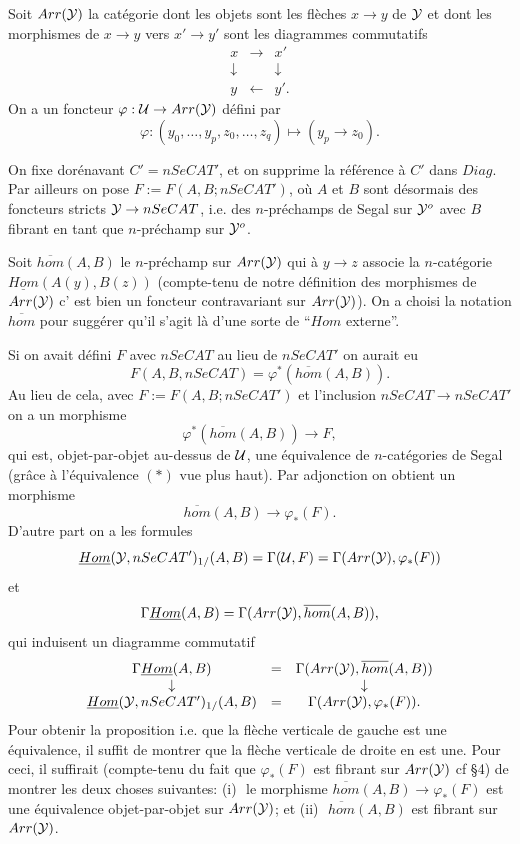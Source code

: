 \documentclass[12pt]{article}
\newcommand{\Uu}{{\cal U}}
\newcommand{\Yy}{{\cal Y}}
\begin{document}
Soit $Arr(\Yy )$ la cat\'egorie dont les objets sont les fl\`eches
$x\rightarrow y$ de $\Yy$ et dont les morphismes de
$x\rightarrow y$ vers $x'\rightarrow y'$ sont les diagrammes commutatifs
$$
\begin{array}{ccc}
x & \rightarrow & x' \\
\downarrow && \downarrow \\
y& \leftarrow & y' .
\end{array}
$$
On a un foncteur $\varphi : \Uu \rightarrow Arr (\Yy )$ d\'efini par
$$
\varphi : (y_0,\ldots , y_p,z_0,\ldots , z_q)\mapsto (y_p\rightarrow z_0).
$$

On fixe dor\'enavant $C'=nSeCAT'$, et on supprime la r\'ef\'erence \`a
$C'$ dans
$Diag$. Par ailleurs on pose $F:=F(A,B; nSeCAT')$,
o\`u $A$ et $B$ sont d\'esormais
des foncteurs stricts $\Yy \rightarrow nSeCAT$,
i.e. des $n$-pr\'echamps de Segal sur $\Yy ^o$ avec
$B$
fibrant en tant que $n$-pr\'echamp sur $\Yy^o$.

Soit $\overline{hom}(A,B)$ le $n$-pr\'echamp sur $Arr (\Yy )$ qui \`a
$y\rightarrow z$ associe la $n$-cat\'egorie \linebreak
$\underline{Hom}(A(y),B(z))$ (compte-tenu de notre d\'efinition des
morphismes de $Arr(\Yy )$ c'
est bien un foncteur contravariant sur $Arr(\Yy )$). On a choisi
la notation $\overline{hom}$ pour sugg\'erer
qu'il s'agit l\`a d'une sorte de  ``$Hom$ externe''.

Si on avait d\'efini $F$ avec $nSeCAT$ au lieu de $nSeCAT'$
on aurait eu
$$
F(A,B, nSeCAT) = \varphi ^{\ast} (\overline{hom}(A,B)).
$$
Au lieu de cela, avec
$F:= F(A,B; nSeCAT')$
et l'inclusion
$nSeCAT\rightarrow nSeCAT'$ on a un morphisme
$$
\varphi ^{\ast} (\overline{hom}(A,B))\rightarrow F,
$$
qui est, objet-par-objet au-dessus de $\Uu$, une \'equivalence de
$n$-cat\'egories de Segal (gr\^ace \`a l'\'equivalence $(\ast )$
vue plus haut). Par adjonction on obtient un morphisme
$$
\overline{hom}(A,B)\rightarrow \varphi _{\ast}(F).
$$
D'autre part on a les formules
$$
\underline{Hom}(\Yy , nSeCAT')_{1/}(A,B)=\Gamma (\Uu ,F) = \Gamma (Arr(\Yy ),
\varphi _{\ast} (F))
$$
et
$$
\Gamma \underline{Hom}(A,B)= \Gamma (   Arr(\Yy ), \overline{hom}(A,B)),
$$
qui induisent un diagramme commutatif
$$
\begin{array}{ccc}
\Gamma \underline{Hom}(A,B)&= &\Gamma ( Arr(\Yy ), \overline{hom}(A,B))\\
\downarrow && \downarrow \\
\underline{Hom}(\Yy , nSeCAT')_{1/}(A,B)&=& \Gamma (Arr(\Yy ),
\varphi _{\ast} (F)).
\end{array}
$$
Pour obtenir la proposition
i.e. que la fl\`eche verticale de gauche est une \'equivalence, il suffit de
montrer que la fl\`eche verticale de droite en est une. Pour ceci, il
suffirait  (compte-tenu du fait que $\varphi _{\ast} (F)$ est fibrant
sur $Arr(\Yy )$
cf \S 4)
de montrer les deux choses suivantes:
\newline
(i)\,\, le morphisme $\overline{hom}(A,B)\rightarrow \varphi _{\ast}(F)$ est
une \'equivalence objet-par-objet sur $Arr(\Yy )$; et
\newline
(ii)\,\, $\overline{hom}(A,B)$ est fibrant sur $Arr(\Yy )$.
\end{document}
